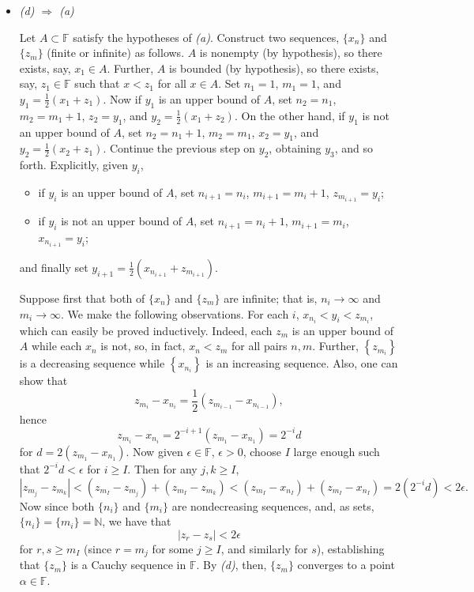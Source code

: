 \documentclass{article}
\begin{document}
\begin{enumerate}
\begin{itemize}
\item {\em (d) \(\Rightarrow\) (a)}

Let \(A \subset \mathbb{F}\) satisfy the hypotheses of {\em (a)}.  Construct two sequences, \(\{x_n\}\) and \(\{z_m\}\) (finite or infinite) as follows.  \(A\) is nonempty (by hypothesis), so there exists, say, \(x_1 \in A\).  Further, \(A\) is bounded (by hypothesis), so there exists, say, \(z_1 \in \mathbb{F}\) such that \(x < z_1\) for all \(x \in A\).  Set \(n_1 = 1\), \(m_1 = 1\), and \(y_1 = \frac{1}{2} (x_1 + z_1)\).  Now if \(y_1\) is an upper bound of \(A\), set \(n_2 = n_1\), \(m_2 = m_1 + 1\), \(z_2 = y_1\), and \(y_2 = \frac{1}{2} (x_1 + z_2)\).  On the other hand, if \(y_1\) is not an upper bound of \(A\), set \(n_2 = n_1 + 1\), \(m_2 = m_1\), \(x_2 = y_1\), and \(y_2 = \frac{1}{2} (x_2 + z_1)\).  Continue the previous step on \(y_2\), obtaining \(y_3\), and so forth.  Explicitly, given \(y_i\),
\begin{itemize}
\item if \(y_i\) is an upper bound of \(A\), set \(n_{i + 1} = n_i\), \(m_{i + 1} = m_i + 1\), \(z_{m_{i + 1}} = y_i\);
\item if \(y_i\) is not an upper bound of \(A\), set \(n_{i + 1} = n_i + 1\), \(m_{i + 1} = m_i\), \(x_{n_{i + 1}} = y_i\);
\end{itemize}
and finally set \(y_{i+1} = \frac{1}{2} \left( x_{n_{i + 1}} + z_{m_{i + 1}} \right)\).

Suppose first that both of \(\{x_n\}\) and \(\{z_m\}\) are infinite; that is, \(n_i \to \infty\) and \(m_i \to \infty\).  We make the following observations.  For each \(i\), \(x_{n_i} < y_i < z_{m_i}\), which can easily be proved inductively.  Indeed, each \(z_m\) is an upper bound of \(A\) while each \(x_n\) is not, so, in fact, \(x_n < z_m\) for all pairs \(n,m\).  Further, \(\left\{ z_{m_i} \right\}\) is a decreasing sequence while \(\left\{ x_{n_i} \right\}\) is an increasing sequence.  Also, one can show that
\[z_{m_i} - x_{n_i} = \frac{1}{2} \left( z_{m_{i - 1}} - x_{n_{i - 1}} \right),\]
hence
\[z_{m_i} - x_{n_i} = 2^{-i + 1} \left( z_{m_1} - x_{n_1} \right) = 2^{-i} d\]
for \(d = 2 \left( z_{m_1} - x_{n_1} \right)\).  Now given \(\epsilon \in \mathbb{F}\), \(\epsilon > 0\), choose \(I\) large enough such that \(2^{-i} d < \epsilon\) for \(i \geq I\).  Then for any \(j,k \geq I\),
\[\left| z_{m_j} - z_{m_k} \right|
  < \left( z_{m_I} - z_{m_j} \right) + \left( z_{m_I} - z_{m_k} \right)
  < \left( z_{m_I} - x_{n_I} \right) + \left( z_{m_I} - x_{n_I} \right)
  = 2 \left( 2^{-i} d \right)
  < 2 \epsilon.\]
Now since both \(\{n_i\}\) and \(\{m_i\}\) are nondecreasing sequences, and, as sets, \(\{n_i\} = \{m_i\} = \mathbb{N}\), we have that
\[\left| z_r - z_s \right| < 2\epsilon\]
for \(r,s \geq m_I\) (since \(r = m_j\) for some \(j \geq I\), and similarly for \(s\)), establishing that \(\{z_m\}\) is a Cauchy sequence in \(\mathbb{F}\).  By {\em (d)}, then, \(\{z_m\}\) converges to a point \(\alpha \in \mathbb{F}\).


\end{itemize}
\end{enumerate}
\end{document}
